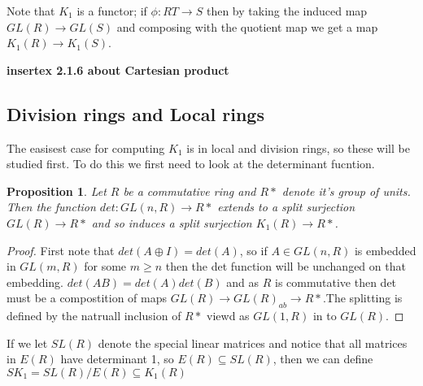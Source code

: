 \documentclass[a4paper,10pt]{article}
\newtheorem{prop}[thm]{Proposition}
\begin{document}
Note that $K_{1}$ is a functor; if $\phi:RT\rightarrow S$ then by taking the induced map $GL(R)\rightarrow GL(S)$ and composing with the quotient map we get a map $K_{1}(R)\rightarrow K_{1}(S)$.

\textbf{insertex 2.1.6 about Cartesian product}

\subsection{Division rings and Local rings}

The easisest case for computing $K_{1}$ is in local and division rings, so these will be studied first. To do this we first need to look at the determinant fucntion.

\begin{prop}
Let $R$ be a commutative ring and $R*$ denote it's group of units. Then the function $det:GL(n,R)\rightarrow R*$ extends to a split surjection $GL(R)\rightarrow R*$ and so induces a split surjection $K_{1}(R)\rightarrow R*$.
\end{prop}
\begin{proof}
First note that $det(A\oplus I)=det(A)$, so if $A\in GL(n,R)$ is embedded in $GL(m,R)$ for some $m\geq n$ then the det function will be unchanged on that embedding. $det(AB)=det(A)det(B)$ and as $R$ is commutative then det must be a compostition of maps $GL(R)\rightarrow GL(R)_{ab}\rightarrow R*$.The splitting is defined by the natruall inclusion of $R*$ viewd as $GL(1,R)$ in to $GL(R)$.
\end{proof}

If we let $SL(R)$ denote the special linear matrices and notice that all matrices in $E(R)$ have determinant 1, so $E(R)\subseteq SL(R)$, then we can define $SK_{1}=SL(R)/E(R)\subseteq K_{1}(R)$
\end{document}
